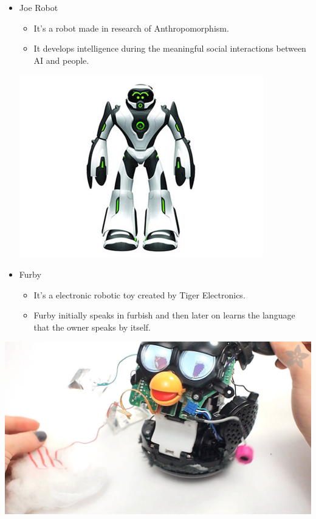\documentclass{fisatproject}
\begin{document}
\begin{itemize}
\item Joe Robot
    \begin{itemize}
        \item It’s a robot made in research of Anthropomorphism.
        \item It develops intelligence during the meaningful social
interactions between AI and people.
    \end{itemize}
    \newpage
\begin{center}
\includegraphics{joe_bot.png}
\end{center}    
\item Furby
    \begin{itemize}
        \item It’s a electronic robotic toy created by Tiger Electronics.
        \item Furby initially speaks in furbish and then later on learns the language that the owner speaks by itself.
    \end{itemize}
\end{itemize}
\begin{center}
\includegraphics[scale=0.3]{furby.png}
\end{center}    
\end{document}
